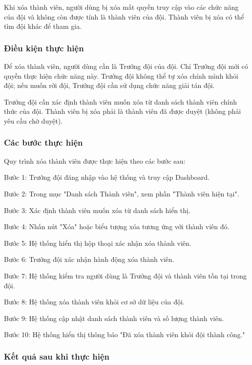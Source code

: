 Khi xóa thành viên, người dùng bị xóa mất quyền truy cập vào các chức năng của đội và không còn được tính là thành viên của đội. Thành viên bị xóa có thể tìm đội khác để tham gia.

\subsubsection{Điều kiện thực hiện}

Để xóa thành viên, người dùng cần là Trưởng đội của đội. Chỉ Trưởng đội mới có quyền thực hiện chức năng này. Trưởng đội không thể tự xóa chính mình khỏi đội; nếu muốn rời đội, Trưởng đội cần sử dụng chức năng giải tán đội.

Trưởng đội cần xác định thành viên muốn xóa từ danh sách thành viên chính thức của đội. Thành viên bị xóa phải là thành viên đã được duyệt (không phải yêu cầu chờ duyệt).

\subsubsection{Các bước thực hiện}

Quy trình xóa thành viên được thực hiện theo các bước sau:

Bước 1: Trưởng đội đăng nhập vào hệ thống và truy cập Dashboard.

Bước 2: Trong mục "Danh sách Thành viên", xem phần "Thành viên hiện tại".

Bước 3: Xác định thành viên muốn xóa từ danh sách hiển thị.

Bước 4: Nhấn nút "Xóa" hoặc biểu tượng xóa tương ứng với thành viên đó.

Bước 5: Hệ thống hiển thị hộp thoại xác nhận xóa thành viên.

Bước 6: Trưởng đội xác nhận hành động xóa thành viên.

Bước 7: Hệ thống kiểm tra người dùng là Trưởng đội và thành viên tồn tại trong đội.

Bước 8: Hệ thống xóa thành viên khỏi cơ sở dữ liệu của đội.

Bước 9: Hệ thống cập nhật danh sách thành viên và số lượng thành viên.

Bước 10: Hệ thống hiển thị thông báo "Đã xóa thành viên khỏi đội thành công."

\subsubsection{Kết quả sau khi thực hiện}

